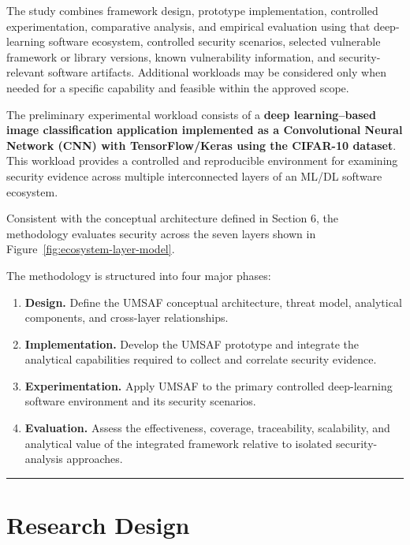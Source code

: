 \documentclass[
  12pt,
  letterpaper,
  oneside]{report}
\begin{document}
The study combines framework design, prototype implementation,
controlled experimentation, comparative analysis, and empirical
evaluation using that deep-learning software ecosystem, controlled
security scenarios, selected vulnerable framework or library versions,
known vulnerability information, and security-relevant software
artifacts. Additional workloads may be considered only when needed for a
specific capability and feasible within the approved scope.

The preliminary experimental workload consists of a \textbf{deep
learning--based image classification application implemented as a
Convolutional Neural Network (CNN) with TensorFlow/Keras using the
CIFAR-10 dataset}. This workload provides a controlled and reproducible
environment for examining security evidence across multiple
interconnected layers of an ML/DL software ecosystem.

Consistent with the conceptual architecture defined in Section 6, the
methodology evaluates security across the seven layers shown in
Figure~\ref{fig:ecosystem-layer-model}.

The methodology is structured into four major phases:

\begin{enumerate}
\item
  \textbf{Design.} Define the UMSAF conceptual architecture, threat
  model, analytical components, and cross-layer relationships.
\item
  \textbf{Implementation.} Develop the UMSAF prototype and integrate
  the analytical capabilities required to collect and correlate
  security evidence.
\item
  \textbf{Experimentation.} Apply UMSAF to the primary controlled
  deep-learning software environment and its security scenarios.
\item
  \textbf{Evaluation.} Assess the effectiveness, coverage, traceability,
  scalability, and analytical value of the integrated framework
  relative to isolated security-analysis approaches.
\end{enumerate}

\begin{center}\rule{0.5\linewidth}{0.5pt}\end{center}

\section{Research Design}\label{112-research-design}
\end{document}
